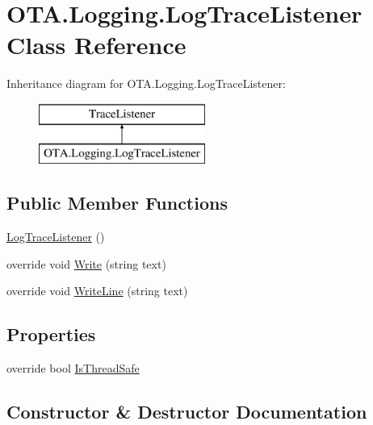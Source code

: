 \hypertarget{class_o_t_a_1_1_logging_1_1_log_trace_listener}{}\section{O\+T\+A.\+Logging.\+Log\+Trace\+Listener Class Reference}
\label{class_o_t_a_1_1_logging_1_1_log_trace_listener}
Inheritance diagram for O\+T\+A.\+Logging.\+Log\+Trace\+Listener\+:\begin{figure}[H]
\begin{center}
\leavevmode
\includegraphics[height=2.000000cm]{class_o_t_a_1_1_logging_1_1_log_trace_listener}
\end{center}
\end{figure}
\subsection*{Public Member Functions}
\begin{DoxyCompactItemize}
\item 
\hyperlink{class_o_t_a_1_1_logging_1_1_log_trace_listener_a6f15a0f41a443c40e053cb9bb23d6f39}{Log\+Trace\+Listener} ()
\item 
override void \hyperlink{class_o_t_a_1_1_logging_1_1_log_trace_listener_a226c97d8a275a0555b123dd1901e0de4}{Write} (string text)
\item 
override void \hyperlink{class_o_t_a_1_1_logging_1_1_log_trace_listener_a2af695bb7e577cbe648ca29645680aa9}{Write\+Line} (string text)
\end{DoxyCompactItemize}
\subsection*{Properties}
\begin{DoxyCompactItemize}
\item 
override bool \hyperlink{class_o_t_a_1_1_logging_1_1_log_trace_listener_a3e5c85aff5d05b50104d6999c3e3ab57}{Is\+Thread\+Safe}
\end{DoxyCompactItemize}


\subsection{Constructor \& Destructor Documentation}
\hypertarget{class_o_t_a_1_1_logging_1_1_log_trace_listener_a6f15a0f41a443c40e053cb9bb23d6f39}{}
